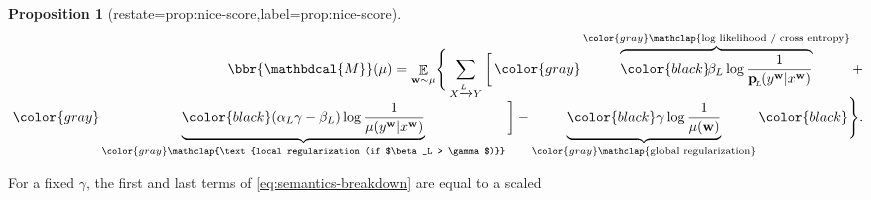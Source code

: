 \documentclass[letterpaper]{article} %
\theoremstyle{plain}
\newtheorem{prop}[theorem]{Proposition}
\theoremstyle{definition}
\theoremstyle{remark}
\newcommand{\valpha}[1]{#1}
\DeclareMathOperator*{\Ex}{\mathbb{E}} %
\newcommand\mat[1]{\mathbf{#1}}
\newcommand{\bp}[1][L]{\mat{p}_{\!_{#1}\!}}
\newcommand{\V}{\mathcal V}
\newcommand{\dg}[1]{\mathbdcal{#1}}
\newcommand\GFE{\mathit{G\mkern-4mu F\mkern-4.5mu E}}
\begin{document}
\begin{prop}[restate=prop:nice-score,label=prop:nice-score]
\begin{equation}
\begin{split}
\bbr{\dg M}(\mu) =  \Ex_{\mat w \sim \mu}\! \Bigg\{
 \sum_{ X \xrightarrow{\!\!L} Y  }
\bigg[\,
    \color{gray}\overbrace{\color{black}
      \!\beta_L \log \frac{1}{\bp(y^{\mat w} |x^{\mat w})}
	}^{\color{gray}\smash{\mathclap{\text{log likelihood / cross entropy}}}} + \\[-0.5em]
    \color{gray}\underbrace{\color{black} 
(\valpha{\alpha_L}\gamma - \beta_L ) \log \frac{1}{\mu(y^{\mat w} |x^{\mat w})} 
	}_{\color{gray}\smash{\mathclap{\text{local regularization (if $\beta_L > \gamma$)}}}}\bigg] - \underbrace{\color{black}
\gamma \log \frac{1}{\mu(\mat w)}
	}_{\color{gray}\smash{\mathclap{\text{global
        regularization}}}}\color{black} \Bigg\} .
\end{split}
\end{equation}
\end{prop}
For a fixed $\gamma$, the first and last terms
of \eqref{eq:semantics-breakdown} are equal to a scaled
\end{document}
